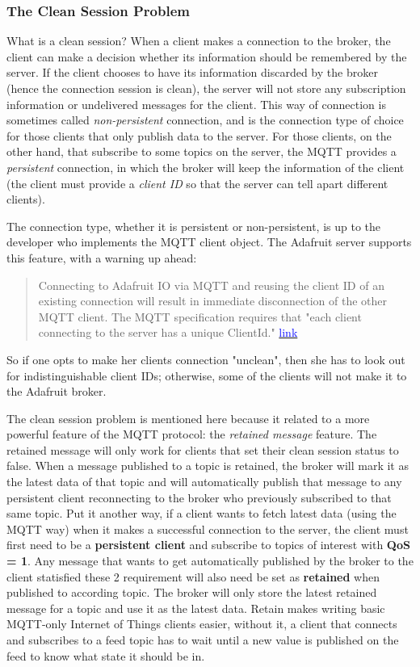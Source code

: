 \subsubsection{The Clean Session Problem}
What is a clean session? When a client makes a connection to the broker, the client can make a decision whether its information should be remembered by the server. If the client chooses to have its information discarded by the broker (hence the connection session is clean), the server will not store any subscription information or undelivered messages for the client. This way of connection is sometimes called \textit{non-persistent} connection, and is the connection type of choice for those clients that only publish data to the server. For those clients, on the other hand, that subscribe to some topics on the server, the MQTT provides a \textit{persistent} connection, in which the broker will keep the information of the client (the client must provide a \textit{client ID} so that the server can tell apart different clients).

The connection type, whether it is persistent or non-persistent, is up to the developer who implements the MQTT client object. The Adafruit server supports this feature, with a warning up ahead:
\begin{quote}
    Connecting to Adafruit IO via MQTT and reusing the client ID of an existing connection will result in immediate disconnection of the other MQTT client. The MQTT specification requires that "each client connecting to the server has a unique ClientId." \href{http://docs.oasis-open.org/mqtt/mqtt/v3.1.1/csprd02/mqtt-v3.1.1-csprd02.html#_Toc385349767}{\textcolor{blue}{link}}
\end{quote}
So if one opts to make her clients connection "unclean", then she has to look out for indistinguishable client IDs; otherwise, some of the clients will not make it to the Adafruit broker.

The clean session problem is mentioned here because it related to a more powerful feature of the MQTT protocol: the \textit{retained message} feature. The retained message will only work for clients that set their clean session status to false. When a message published to a topic is retained, the broker will mark it as the latest data of that topic and will automatically publish that message to any persistent client reconnecting to the broker who previously subscribed to that same topic. Put it another way, if a client wants to fetch latest data (using the MQTT way) when it makes a successful connection to the server, the client must first need to be a \textbf{persistent client} and subscribe to topics of interest with \textbf{QoS = 1}. Any message that wants to get automatically published by the broker to the client statisfied these 2 requirement will also need be set as \textbf{retained} when published to according topic. The broker will only store the latest retained message for a topic and use it as the latest data. Retain makes writing basic MQTT-only Internet of Things clients easier, without it, a client that connects and subscribes to a feed topic has to wait until a new value is published on the feed to know what state it should be in.

